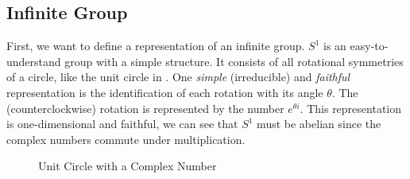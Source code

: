 \subsection{Infinite Group}

First, we want to define a representation of an infinite group.
$S^1$ is an easy-to-understand group with a simple structure.
It consists of all rotational symmetries of a circle, like the unit circle in .
One \textit{simple} (irreducible) and \textit{faithful} representation is the identification of each rotation with its angle $\theta$.
The (counterclockwise) rotation is represented by the number $e^{\theta i}$.
This representation is one-dimensional and faithful, we can see that $S^1$ must be abelian since the complex numbers commute under multiplication.


\begin{figure}[!h]
    \centering


    \caption{Unit Circle with a Complex Number}
    \label{fig:infinite.group.unit}
\end{figure}
